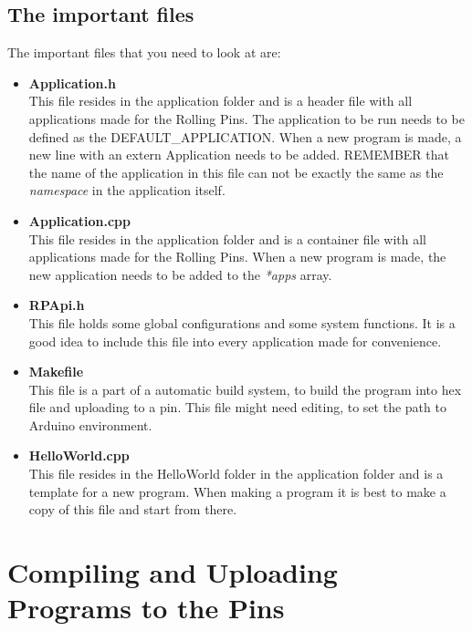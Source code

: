 \documentclass[a4paper, twoside, final]{book}%
\begin{document}
\subsection*{The important files}
The important files that you need to look at are:
\begin{itemize}
  
  \item \textbf{Application.h}\\
  This file resides in the application folder and is a header file with all applications made for the Rolling Pins. The application to be run needs to be defined as the DEFAULT\_APPLICATION. When a new program is made, a new line with an extern Application needs to be added.
  REMEMBER that the name of the application in this file can not be exactly the same as the \emph{namespace} in the application itself.

  \item \textbf{Application.cpp}\\
  This file resides in the application folder and is a container file with all applications made for the Rolling Pins. When a new program is made, the new application needs to be added to the \emph{*apps} array.\\

  \item \textbf{RPApi.h}\\
  This file holds some global configurations and some system functions. It is a good idea to include this file into every application made for convenience. 
  
  \item \textbf{Makefile}\\
  This file is a part of a automatic build system, to build the program into hex file and uploading to a pin. This file might need editing, to set the path to Arduino environment.

  \item \textbf{HelloWorld.cpp}\\
  This file resides in the HelloWorld folder in the application folder and is a template for a new program. When making a program it is best to make a copy of this file and start from there.
  
\end{itemize}

\newpage
\section{Compiling and Uploading Programs to the Pins}
\end{document}
